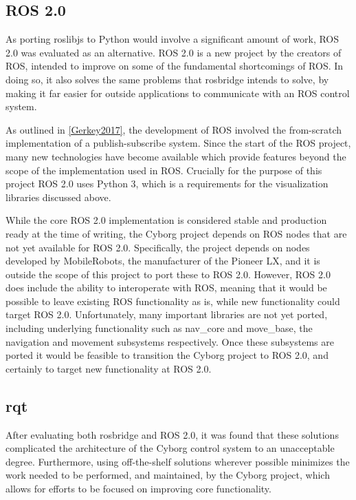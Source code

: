 \documentclass[\rootfolder/main.tex]{subfiles}
\begin{document}
\subsection{ROS 2.0}

As porting roslibjs to Python would involve a significant amount of work, ROS 2.0 was evaluated as an alternative.
ROS 2.0 is a new project by the creators of ROS, intended to improve on some of the fundamental shortcomings of ROS.
In doing so, it also solves the same problems that rosbridge intends to solve, by making it far easier for outside applications to communicate with an ROS control system.

As outlined in \cref{Gerkey2017}, the development of ROS involved the from-scratch implementation of a publish-subscribe system.
Since the start of the ROS project, many new technologies have become available which provide features beyond the scope of the implementation used in ROS.
Crucially for the purpose of this project ROS 2.0 uses Python 3, which is a requirements for the visualization libraries discussed above.

While the core ROS 2.0 implementation is considered stable and production ready at the time of writing, the Cyborg project depends on ROS nodes that are not yet available for ROS 2.0.
Specifically, the project depends on nodes developed by MobileRobots, the manufacturer of the Pioneer LX, and it is outside the scope of this project to port these to ROS 2.0.
However, ROS 2.0 does include the ability to interoperate with ROS, meaning that it would be possible to leave existing ROS functionality as is, while new functionality could target ROS 2.0.
Unfortunately, many important libraries are not yet ported, including underlying functionality such as nav\_core and move\_base, the navigation and movement subsystems respectively.
Once these subsystems are ported it would be feasible to transition the Cyborg project to ROS 2.0, and certainly to target new functionality at ROS 2.0.

\subsection{rqt}

After evaluating both rosbridge and ROS 2.0, it was found that these solutions complicated the architecture of the Cyborg control system to an unacceptable degree.
Furthermore, using off-the-shelf solutions wherever possible minimizes the work needed to be performed, and maintained, by the Cyborg project, which allows for efforts to be focused on improving core functionality.
\end{document}
